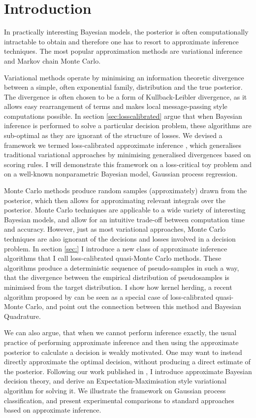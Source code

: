 \section{Introduction}

In practically interesting Bayesian models, the posterior is often computationally intractable to obtain and therefore one has to resort to approximate inference techniques. The most popular approximation methods are variational inference and Markov chain Monte Carlo.

Variational methods operate by minimising an information theoretic divergence between a simple, often exponential family, distribution and the true posterior. The divergence is often chosen to be a form of Kullback-Leibler divergence, as it allows easy rearrangement of terms and makes local message-passing style computations possible. In section \ref{sec:losscalibrated} argue that when Bayesian inference is performed to solve a particular decision problem, these algorithms are sub-optimal as they are ignorant of the structure of losses. We devised a framework we termed loss-calibrated approximate inference \cite{}, which generalises traditional variational approaches by minimising generalised divergences based on scoring rules. I will demonstrate this framework on a loss-critical toy problem and on a well-known nonparametric Bayesian model, Gaussian process regression.

Monte Carlo methods produce random samples (approximately) drawn from the posterior, which then allows for approximating relevant integrals over the posterior. Monte Carlo techniques are applicable to a wide variety of interesting Bayesian models, and allow for an intuitive trade-off between computation time and accuracy. However, just as most variational approaches, Monte Carlo techniques are also ignorant of the decisions and losses involved in a decision problem. In section \ref{sec:} I introduce a new class of approximate inference algorithms that I call loss-calibrated quasi-Monte Carlo methods. These algorithms produce a deterministic sequence of pseudo-samples in such a way, that the divergence between the empirical distribution of pseudosamples is minimised from the target distribution. I show how kernel herding, a recent algorithm proposed by \cite{kernelherding} can be seen as a special case of loss-calibrated quasi-Monte Carlo, and point out the connection between this method and Bayesian Quadrature.

We can also argue, that when we cannot perform inference exactly, the usual practice of performing approximate inference and then using the approximate posterior to calculate a decision is weakly motivated. One may want to instead directly approximate the optimal decision, without producing a direct estimate of the posterior. Following our work published in \cite{Simonspaper}, I introduce approximate Bayesian decision theory, and derive an Expectation-Maximisation style variational algorithm for solving it. We illustrate the framework on Gaussian process classification, and present experimental comparisons to standard approaches based on approximate inference.

